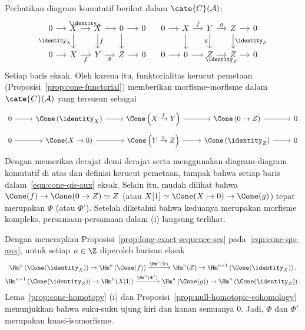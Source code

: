 \begin{bukti}
	Perhatikan diagram komutatif berikut dalam $\cate{C}(\mathcal{A})$:
	\[\begin{tikzcd}[column sep=small]
		0 \arrow[r] & X \arrow[r, "\identity_X"] \arrow[d, "{\identity_X}"'] & X \arrow[r] \arrow[d, "f"] & 0 \arrow[r] \arrow[d] & 0 \\
		0 \arrow[r] & X \arrow[r, "f"'] & Y \arrow[r, "g"'] & Z \arrow[r] & 0
	\end{tikzcd} \quad \begin{tikzcd}[column sep=small]
		0 \arrow[r] & X \arrow[d] \arrow[r, "f"] & Y \arrow[d, "g"'] \arrow[r, "g"] & Z \arrow[d, "\identity_Z"] \arrow[r] & 0 \\
		0 \arrow[r] & 0 \arrow[r] & Z \arrow[r, "\identity_Z"'] & Z \arrow[r] & 0
	\end{tikzcd}\]
	Setiap baris eksak. Oleh karena itu, funktorialitas kerucut pemetaan
	(Proposisi~\ref{prop:cone-functorial}) memberikan morfisme-morfisme dalam
	$\cate{C}(\mathcal{A})$ yang tersusun sebagai
	\begin{equation}\label{eqn:cone-qis-aux}\begin{tikzcd}[row sep=tiny]
		0 \arrow[r] & \Cone\left( \identity_X \right) \arrow[r] & \Cone\left( X \xrightarrow{f} Y \right) \arrow[r] & \Cone\left( 0 \to Z \right) \arrow[r] & 0 \\
		0 \arrow[r] & \Cone(X \to 0) \arrow[r] & \Cone\left( Y \xrightarrow{g} Z \right) \arrow[r] & \Cone\left( \identity_Z \right) \arrow[r] & 0
	\end{tikzcd}\end{equation}
	Dengan memeriksa derajat demi derajat serta menggunakan diagram-diagram
	komutatif di atas dan definisi kerucut pemetaan, tampak bahwa setiap baris
	dalam~\eqref{eqn:cone-qis-aux} eksak. Selain itu, mudah dilihat bahwa
	$\Cone(f)\to\Cone(0\to Z)\simeq Z$ (atau
	$X[1]\simeq\Cone(X\to0)\to\Cone(g)$) tepat merupakan $\Phi$ (atau
	$\Phi'$). Setelah diketahui bahwa keduanya merupakan morfisme kompleks,
	persamaan-persamaan dalam (i) langsung terlihat.

	Dengan menerapkan Proposisi~\ref{prop:long-exact-sequence-ses}
	pada~\eqref{eqn:cone-qis-aux}, untuk setiap $n\in\Z$ diperoleh barisan eksak
	\begin{gather*}
		\Hm^n\left( \Cone(\identity_X) \right) \to \Hm^n \left( \Cone(f) \right) \xrightarrow{\Hm^n(\Phi)} \Hm^n(Z) \to \Hm^{n+1} \left( \Cone(\identity_X) \right), \\
		\Hm^{n-1}\left( \Cone(\identity_Z) \right) \to \Hm^n(X[1]) \xrightarrow{\Hm^n(\Phi')} \Hm^n\left( \Cone(g) \right) \to \Hm^n\left( \Cone(\identity_Z) \right).
	\end{gather*}
	Lema~\ref{prop:cone-homotopy} (i) dan
	Proposisi~\ref{prop:null-homotopic-cohomology} menunjukkan bahwa suku-suku
	ujung kiri dan kanan semuanya $0$. Jadi, $\Phi$ dan $\Phi'$ merupakan
	kuasi-isomorfisme.


\end{bukti}
